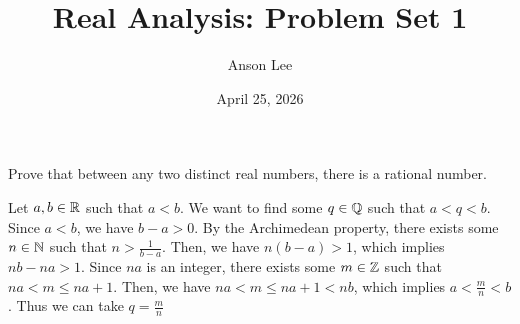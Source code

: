 \documentclass[11pt]{article}
\title{Real Analysis: Problem Set 1}
\author{Anson Lee}
\date{April 25, 2026}
\begin{document}
\maketitle

\begin{problem}
  Prove that between any two distinct real numbers, there is a rational number.
\end{problem}

\begin{solution}
  Let $a, b \in \mathbb{R}$ such that $a < b$. We want to find some $q \in \mathbb{Q}$ such that $a < q < b.$
  Since $a < b$, we have $b - a > 0$. By the Archimedean property, there exists some $n \in \mathbb{N}$ such that $n > \frac{1}{b - a}$.
  Then, we have $n(b - a) > 1$, which implies $nb - na > 1$. Since $na$ is an integer, there exists some $m \in \mathbb{Z}$ such that $na < m \leq na + 1$. Then, we have $na < m \leq na + 1 < nb$, which implies $a < \frac{m}{n} < b$. Thus we can take $q = \frac{m}{n}$
\end{solution}
\end{document}

